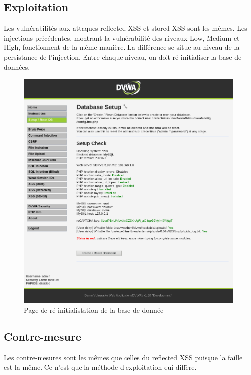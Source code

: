 \subsection{Exploitation}
Les vulnérabilités aux attaques reflected XSS et stored XSS sont les mêmes. Les injections précédentes, montrant la vulnérabilité des niveaux Low, Medium et High,
fonctionnent de la même manière. La différence se situe au niveau de la persistance de l'injection. Entre chaque niveau, on doit ré-initialiser la base de données. 
\begin{figure}[H]
	\begin{center}
		\includegraphics[scale=\scaledvwa]{images/xss/hack4.png}
		\caption{Page de ré-initialistation de la base de donnée} 
		\label{hack4}
	\end{center}
\end{figure}


\subsection{Contre-mesure}

Les contre-mesures sont les mêmes que celles du reflected XSS puisque la faille est la même. Ce  n'est que la méthode d'exploitation qui diffère.


